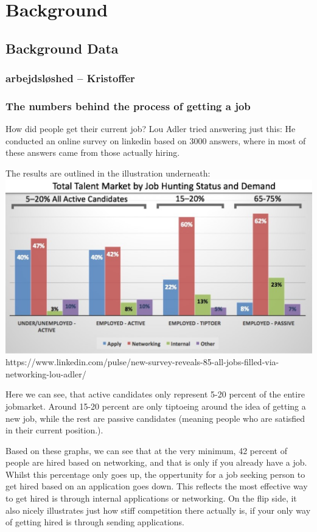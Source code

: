 \section{Background}\label{sec:background}

\subsection{Background Data}

\subsubsection{arbejdsløshed -- Kristoffer}


\subsubsection{The numbers behind the process of getting a job}
How did people get their current job?
Lou Adler tried answering just this: He conducted an online survey
on linkedin based on 3000 answers, where in most of these answers
came from those actually hiring.

The results are outlined in the illustration underneath:
\includegraphics{figures/hiringpeople.png}
https://www.linkedin.com/pulse/new-survey-reveals-85-all-jobs-filled-via-networking-lou-adler/

Here we can see, that active candidates only represent 5-20 percent of the
entire jobmarket. Around 15-20 percent are only tiptoeing around the idea
of getting a new job, while the rest are passive candidates (meaning people who are
satisfied in their current position.).

Based on these graphs, we can see that at the very minimum, 42 percent of people are
hired based on networking, and that is only if you already have a job.
Whilst this percentage only goes up, the oppertunity for a job seeking person
to get hired based on an application goes down. This reflects the
most effective way to get hired is through internal applications or networking.
On the flip side, it also nicely illustrates just how stiff competition there actually is,
if your only way of getting hired is through sending applications.


